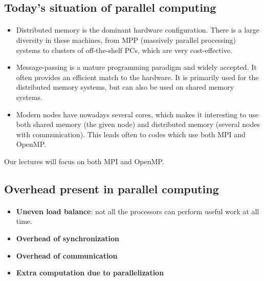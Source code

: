 \documentclass[%
oneside,                 %
final,                   %
10pt]{article}
\begin{document}
\eccq


\subsection{Today's situation of parallel computing}

\paragraph{}

\begin{itemize}
\item Distributed memory is the dominant hardware configuration. There is a large diversity in these machines, from  MPP (massively parallel processing) systems to clusters of off-the-shelf PCs, which are very cost-effective.

\item Message-passing is a mature programming paradigm and widely accepted. It often provides an efficient match to the hardware. It is primarily used for the distributed memory systems, but can also be used on shared memory systems.

\item Modern nodes have nowadays several cores, which makes it interesting to use both shared memory (the given node) and distributed memory (several nodes with communication). This leads often to codes which use both MPI and OpenMP.
\end{itemize}

\noindent
Our lectures will focus on both MPI and OpenMP.



\subsection{Overhead present in parallel computing}

\paragraph{}

\begin{itemize}
\item \textbf{Uneven load balance}:  not all the processors can perform useful work at all time.

\item \textbf{Overhead of synchronization}

\item \textbf{Overhead of communication}

\item \textbf{Extra computation due to parallelization}
\end{itemize}
\end{document}
